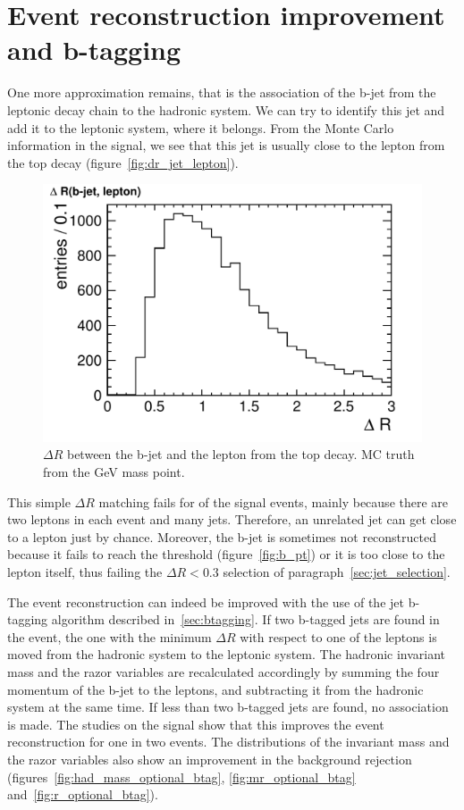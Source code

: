 \section{Event reconstruction improvement and b-tagging}
One more approximation remains, that is the association of the b-jet from the leptonic decay
chain to the hadronic system. We can try to identify this jet and add it to
the leptonic system, where it belongs.
From the Monte Carlo information in the signal, we see that this jet is
usually close to the lepton from the top decay
(figure~\ref{fig:dr_jet_lepton}).
\begin{figure}[h]
    \centering
    \includegraphics[height=.6\textwidth]{images/pdf/signal_mc_dr_jet_lepton}
    \caption{$\Delta R$ between the b-jet and the lepton from the top
        decay. MC truth from the \unit[550]{GeV} mass point.}
\end{figure}
This simple $\Delta R$ matching fails for  of the
signal events, mainly because there are two leptons in each event and many
jets. Therefore, an unrelated jet can get close to a lepton just by chance.
Moreover, the b-jet is sometimes not reconstructed because it fails to reach the \pt
threshold (figure~\ref{fig:b_pt}) or it is too close to the lepton itself,
thus failing the $\Delta R < 0.3$ selection of
paragraph~\ref{sec:jet_selection}.

The event reconstruction can indeed be improved with the use of the jet
b-tagging algorithm described in~\ref{sec:btagging}. If two b-tagged jets
are found in the event, the one with the minimum $\Delta R$ with respect to
one of the leptons is moved from the hadronic system to the leptonic system.
The hadronic invariant mass and the razor variables are recalculated
accordingly by summing the four momentum of the b-jet to the leptons, and
subtracting it from the hadronic system at the same time.
If less than two b-tagged jets are found, no association is made.
The studies on the signal show that this improves the event reconstruction
for one in two events. The distributions of the invariant mass and the razor
variables also show an improvement in the background rejection
(figures~\ref{fig:had_mass_optional_btag}, \ref{fig:mr_optional_btag}
and~\ref{fig:r_optional_btag}).

